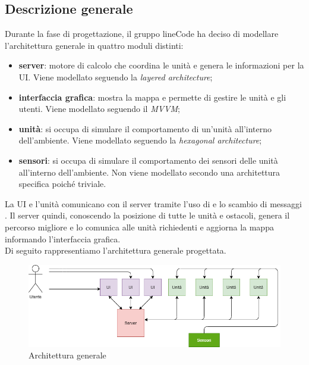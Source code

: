 \subsection{Descrizione generale}
Durante la fase di progettazione, il gruppo lineCode ha deciso di modellare l'architettura generale in quattro moduli distinti:
\begin{itemize}
	\item \textbf{server}: motore di calcolo che coordina le unità e genera le informazioni per la UI. Viene modellato seguendo la \textit{layered architecture};
	\item \textbf{interfaccia grafica}: mostra la mappa e permette di gestire le unità e gli utenti. Viene modellato seguendo il \textit{MVVM};
	\item \textbf{unità}: si occupa di simulare il comportamento di un'unità all'interno dell'ambiente. Viene modellato seguendo la \textit{hexagonal architecture};
	\item \textbf{sensori}: si occupa di simulare il comportamento dei sensori delle unità all'interno dell'ambiente. Non viene modellato secondo una architettura specifica poiché triviale.
\end{itemize}
La UI e l'unità comunicano con il server tramite l'uso di  e lo scambio di messaggi . Il server quindi, conoscendo la posizione di tutte le unità e ostacoli, genera il percorso migliore e lo comunica alle unità richiedenti e aggiorna la mappa informando l'interfaccia grafica. \\
Di seguito rappresentiamo l'architettura generale progettata. 

\begin{figure}[H]
	\centering
	\includegraphics[width=16cm]{img/arch_generale.png}
	\caption{Architettura generale}
\end{figure}
